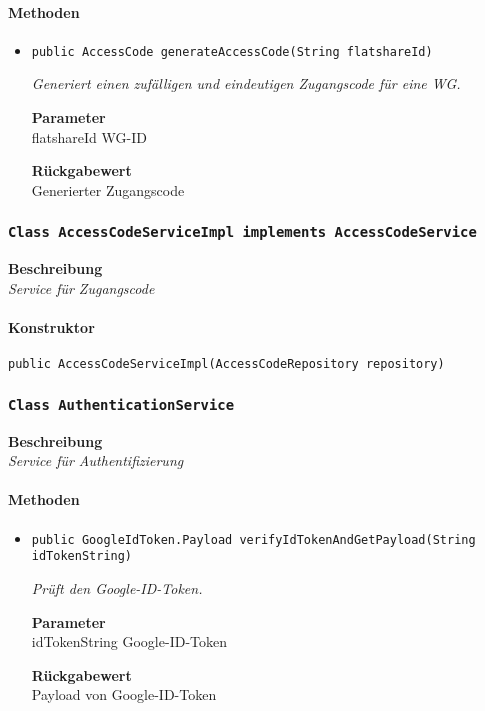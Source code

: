     \paragraph*{Methoden}
    \begin{itemize}
    	\item{\texttt{public AccessCode generateAccessCode(String flatshareId)}}
    	
    	\textit{Generiert einen zufälligen und eindeutigen Zugangscode für eine WG.}
    	
    	\textbf{Parameter} \\
    	flatshareId WG-ID
    	
    	\textbf{Rückgabewert} \\
    	Generierter Zugangscode
    \end{itemize}
    \subsubsection{\texttt{Class AccessCodeServiceImpl implements AccessCodeService}}
    \textbf{Beschreibung} \\
    \textit{Service für Zugangscode}
    \paragraph*{Konstruktor}
    \texttt{public AccessCodeServiceImpl(AccessCodeRepository repository)}
    \subsubsection{\texttt{Class AuthenticationService}}
    \textbf{Beschreibung} \\
    \textit{Service für Authentifizierung}
    \paragraph*{Methoden}
    \begin{itemize}
    	\item{\texttt{public GoogleIdToken.Payload verifyIdTokenAndGetPayload(String idTokenString)}}
    	
    	\textit{Prüft den Google-ID-Token.}
    	
    	\textbf{Parameter} \\
    	idTokenString Google-ID-Token
    	
    	\textbf{Rückgabewert} \\
    	Payload von Google-ID-Token
    \end{itemize}
